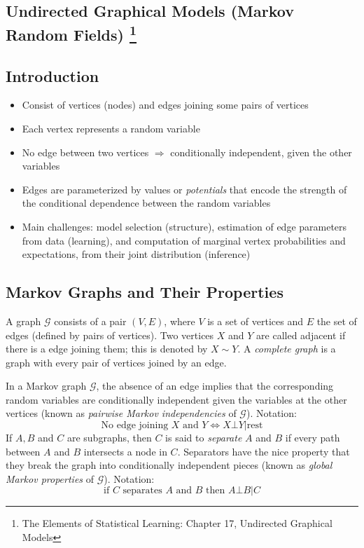 \documentclass{scrartcl}
\begin{document}
\begin{appendices}
\section[Undirected Graphical Models]{Undirected Graphical Models (Markov Random Fields) \protect\footnote{The Elements of Statistical Learning: Chapter 17, Undirected Graphical Models}}
\subsection{Introduction}
\begin{itemize}
    \item
        Consist of vertices (nodes) and edges joining some pairs of vertices
    \item
        Each vertex represents a random variable
    \item
        No edge between two vertices \(\Rightarrow\) conditionally independent, given the other variables
    \item
        Edges are parameterized by values or \textit{potentials} that encode the strength of the conditional dependence between the random variables
    \item
        Main challenges: model selection (structure), estimation of edge parameters from data (learning), and computation of marginal vertex probabilities and expectations, from their joint distribution (inference)
\end{itemize}

\subsection{Markov Graphs and Their Properties}
A graph \(\mathcal{G}\) consists of a pair \((V,E)\), where \(V\) is a set of vertices and \(E\) the set of edges (defined by pairs of vertices). Two vertices \(X\) and \(Y\) are called adjacent if there is a edge joining them; this is denoted by \(X \sim Y\). A \textit{complete graph} is a graph with every pair of vertices joined by an edge.

In a Markov graph \(\mathcal{G}\), the absence of an edge implies that the corresponding random variables are conditionally independent given the variables at the other vertices (known as \textit{pairwise Markov independencies} of \(\mathcal{G}\)). Notation:
\[\text{No edge joining } X \text{ and } Y \Leftrightarrow X \bot Y | \text{rest} \]
If \(A,B\) and \(C\) are subgraphs, then \(C\) is said to \textit{separate} \(A\) and \(B\) if every path between \(A\) and \(B\) intersects a node in \(C\). Separators have the nice property that they break the graph into conditionally independent pieces (known as \textit{global Markov properties} of \(\mathcal{G}\)). Notation:
\[\text{if } C \text{ separates } A \text{ and } B \text{ then } A \bot B |C\]


\end{appendices}
\end{document}
